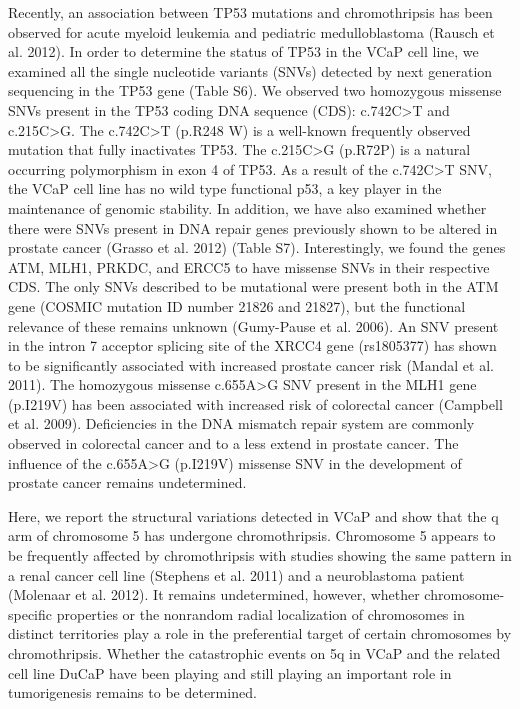 Recently, an association between TP53 mutations and chromothripsis has been observed for acute myeloid leukemia and pediatric medulloblastoma (Rausch et al. 2012). In order to determine the status of TP53 in the VCaP cell line, we examined all the single nucleotide variants (SNVs) detected by next generation sequencing in the TP53 gene (Table S6). We observed two homozygous missense SNVs present in the TP53 coding DNA sequence (CDS): c.742C>T and c.215C>G. The c.742C>T (p.R248 W) is a well-known frequently observed mutation that fully inactivates TP53. The c.215C>G (p.R72P) is a natural occurring polymorphism in exon 4 of TP53. As a result of the c.742C>T SNV, the VCaP cell line has no wild type functional p53, a key player in the maintenance of genomic stability. In addition, we have also examined whether there were SNVs present in DNA repair genes previously shown to be altered in prostate cancer (Grasso et al. 2012) (Table S7). Interestingly, we found the genes ATM, MLH1, PRKDC, and ERCC5 to have missense SNVs in their respective CDS. The only SNVs described to be mutational were present both in the ATM gene (COSMIC mutation ID number 21826 and 21827), but the functional relevance of these remains unknown (Gumy-Pause et al. 2006). An SNV present in the intron 7 acceptor splicing site of the XRCC4 gene (rs1805377) has shown to be significantly associated with increased prostate cancer risk (Mandal et al. 2011). The homozygous missense c.655A>G SNV present in the MLH1 gene (p.I219V) has been associated with increased risk of colorectal cancer (Campbell et al. 2009). Deficiencies in the DNA mismatch repair system are commonly observed in colorectal cancer and to a less extend in prostate cancer. The influence of the c.655A>G (p.I219V) missense SNV in the development of prostate cancer remains undetermined.

Here, we report the structural variations detected in VCaP and show that the q arm of chromosome 5 has undergone chromothripsis. Chromosome 5 appears to be frequently affected by chromothripsis with studies showing the same pattern in a renal cancer cell line (Stephens et al. 2011) and a neuroblastoma patient (Molenaar et al. 2012). It remains undetermined, however, whether chromosome-specific properties or the nonrandom radial localization of chromosomes in distinct territories play a role in the preferential target of certain chromosomes by chromothripsis. Whether the catastrophic events on 5q in VCaP and the related cell line DuCaP have been playing and still playing an important role in tumorigenesis remains to be determined.

